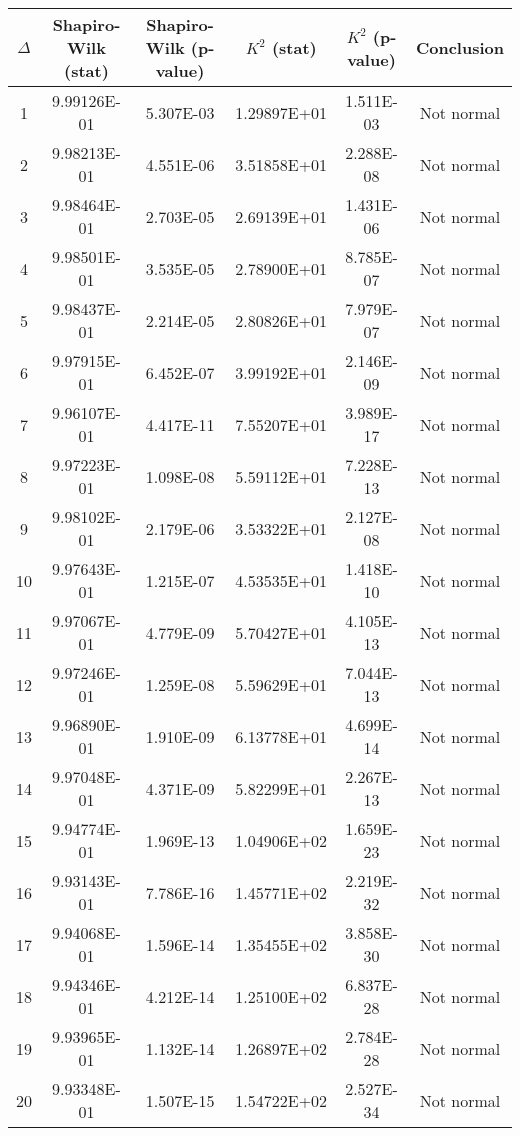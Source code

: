 \begin{table}[h]
	\begin{tabular}{|c|c|c|c|c|c|}
		\hline
		$\Delta$ &  Shapiro-Wilk (stat) & Shapiro-Wilk (p-value) & $K^2$ (stat) & $K^2$ (p-value) & Conclusion\\\hline
		\hline
		1 & 9.99126E-01 & 5.307E-03 & 1.29897E+01 & 1.511E-03 & Not normal\\\hline
		2 & 9.98213E-01 & 4.551E-06 & 3.51858E+01 & 2.288E-08 & Not normal\\\hline
		3 & 9.98464E-01 & 2.703E-05 & 2.69139E+01 & 1.431E-06 & Not normal\\\hline
		4 & 9.98501E-01 & 3.535E-05 & 2.78900E+01 & 8.785E-07 & Not normal\\\hline
		5 & 9.98437E-01 & 2.214E-05 & 2.80826E+01 & 7.979E-07 & Not normal\\\hline
		6 & 9.97915E-01 & 6.452E-07 & 3.99192E+01 & 2.146E-09 & Not normal\\\hline
		7 & 9.96107E-01 & 4.417E-11 & 7.55207E+01 & 3.989E-17 & Not normal\\\hline
		8 & 9.97223E-01 & 1.098E-08 & 5.59112E+01 & 7.228E-13 & Not normal\\\hline
		9 & 9.98102E-01 & 2.179E-06 & 3.53322E+01 & 2.127E-08 & Not normal\\\hline
		10 & 9.97643E-01 & 1.215E-07 & 4.53535E+01 & 1.418E-10 & Not normal\\\hline
		11 & 9.97067E-01 & 4.779E-09 & 5.70427E+01 & 4.105E-13 & Not normal\\\hline
		12 & 9.97246E-01 & 1.259E-08 & 5.59629E+01 & 7.044E-13 & Not normal\\\hline
		13 & 9.96890E-01 & 1.910E-09 & 6.13778E+01 & 4.699E-14 & Not normal\\\hline
		14 & 9.97048E-01 & 4.371E-09 & 5.82299E+01 & 2.267E-13 & Not normal\\\hline
		15 & 9.94774E-01 & 1.969E-13 & 1.04906E+02 & 1.659E-23 & Not normal\\\hline
		16 & 9.93143E-01 & 7.786E-16 & 1.45771E+02 & 2.219E-32 & Not normal\\\hline
		17 & 9.94068E-01 & 1.596E-14 & 1.35455E+02 & 3.858E-30 & Not normal\\\hline
		18 & 9.94346E-01 & 4.212E-14 & 1.25100E+02 & 6.837E-28 & Not normal\\\hline
		19 & 9.93965E-01 & 1.132E-14 & 1.26897E+02 & 2.784E-28 & Not normal\\\hline
		20 & 9.93348E-01 & 1.507E-15 & 1.54722E+02 & 2.527E-34 & Not normal\\\hline

\end{tabular}
\end{table}
